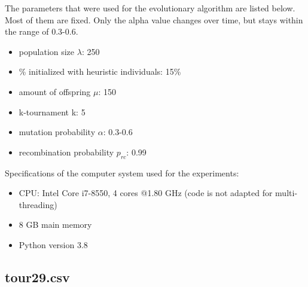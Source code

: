 \documentclass[a4paper,10pt]{article}
\newcommand{\ReplaceMe}[1]{{\color{blue}#1}}
\begin{document}
The parameters that were used for the evolutionary algorithm are listed below. Most of them are fixed. Only the alpha value changes over time, but stays within the range of 0.3-0.6.
\begin{itemize}
    \item population size $\lambda$: 250
    \item \% initialized with heuristic individuals: 15\%
    \item amount of offspring $\mu$: 150
    \item k-tournament k: 5
    \item mutation probability $\alpha$: 0.3-0.6
    \item recombination probability $p_{rc}$: 0.99
\end{itemize}
Specifications of the computer system used for the experiments:
\begin{itemize}
    \item CPU: Intel Core i7-8550, 4 cores @1.80 GHz (code is not adapted for multi-threading)
    \item 8 GB main memory
    \item Python version 3.8
\end{itemize}


\subsection{tour29.csv}




\end{document}
